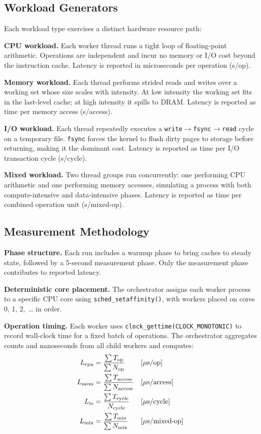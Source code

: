 \documentclass[conference]{IEEEtran}
\begin{document}
\subsection{Workload Generators}

Each workload type exercises a distinct hardware resource path:

\textbf{CPU workload.} Each worker thread runs a tight loop of floating-point
arithmetic.  Operations are independent and incur no memory or I/O cost beyond
the instruction cache.  Latency is reported in microseconds per operation
(\textmu{}s/op).

\textbf{Memory workload.} Each thread performs strided reads and writes over a
working set whose size scales with intensity.  At low intensity the working set
fits in the last-level cache; at high intensity it spills to DRAM.  Latency
is reported as time per memory access (\textmu{}s/access).

\textbf{I/O workload.} Each thread repeatedly executes a
\texttt{write}$\rightarrow$\texttt{fsync}$\rightarrow$\texttt{read}
cycle on a temporary file.  \texttt{fsync} forces the kernel to flush dirty
pages to storage before returning, making it the dominant cost.  Latency is
reported as time per I/O transaction cycle (\textmu{}s/cycle).

\textbf{Mixed workload.} Two thread groups run concurrently: one performing
CPU arithmetic and one performing memory accesses, simulating a process with
both compute-intensive and data-intensive phases.  Latency is reported as time
per combined operation unit (\textmu{}s/mixed-op).

\subsection{Measurement Methodology}

\textbf{Phase structure.} Each run includes a warmup phase to bring caches to
steady state, followed by a 5-second measurement phase.  Only the measurement
phase contributes to reported latency.

\textbf{Deterministic core placement.} The orchestrator assigns each worker
process to a specific CPU core using \texttt{sched\_setaffinity()}, with
workers placed on cores 0, 1, 2,~\ldots{} in order.

\textbf{Operation timing.} Each worker uses \texttt{clock\_gettime(CLOCK\_MONOTONIC)}
to record wall-clock time for a fixed batch of operations.  The orchestrator
aggregates counts and nanoseconds from all child workers and computes:
\begin{align}
L_{\text{cpu}}  &= \frac{\sum T_{\text{op}}}{\sum N_{\text{op}}}
                && [\mu\text{s/op}] \\
L_{\text{mem}}  &= \frac{\sum T_{\text{access}}}{\sum N_{\text{access}}}
                && [\mu\text{s/access}] \\
L_{\text{io}}   &= \frac{\sum T_{\text{cycle}}}{N_{\text{cycle}}}
                && [\mu\text{s/cycle}] \\
L_{\text{mix}}  &= \frac{\sum T_{\text{mix}}}{\sum N_{\text{mix}}}
                && [\mu\text{s/mixed\text{-}op}]
\end{align}
\end{document}
